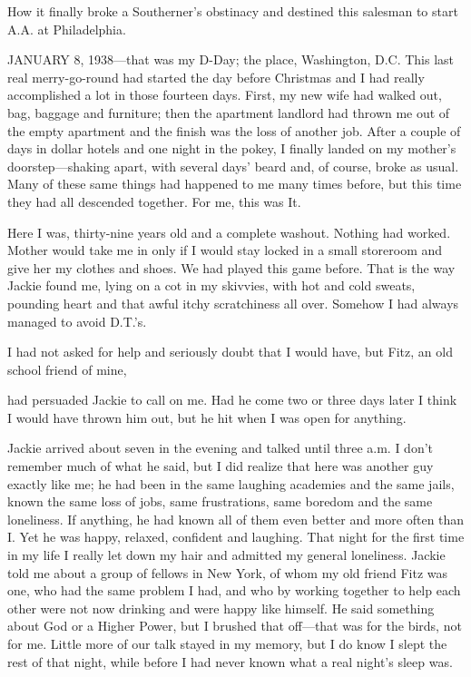 
\bbChapterPreamble


\begin{biblechapter}
    How it finally broke a Southerner’s obstinacy 
    and destined this salesman to start A.A. at Philadelphia.
\end{biblechapter}


\begin{biblechapter}
    JANUARY 8, 1938—that was my D-Day; 
    the place, Washington, D.C.
\verse This last real merry-go-round 
    had started the day before Christmas 
    and I had really accomplished a lot in those fourteen days.
\verse First, my new wife had walked out, 
    bag, baggage and furniture; 
    then the apartment landlord 
    had thrown me out of the empty apartment 
    and the finish was the loss of another job.
\verse After a couple of days in dollar hotels and one night in the pokey, 
    I finally landed on my mother’s doorstep—shaking apart, 
    with several days’ beard and, 
    of course, broke as usual.
\verse Many of these same things had happened to me many times before, 
    but this time they had all descended together.
\verse For me, this was It.

\verse Here I was, thirty-nine years old and a complete washout.
\verse Nothing had worked.
\verse Mother would take me in only if I would stay locked 
    in a small storeroom and give her my clothes and shoes.
\verse We had played this game before.
\verse That is the way Jackie found me, 
    lying on a cot in my skivvies, 
    with hot and cold sweats, 
    pounding heart and that awful itchy scratchiness all over.
\verse Somehow I had always managed to avoid D.T.’s.

I had not asked for help and seriously doubt that I would have, but Fitz, an old school friend of mine,

had persuaded Jackie to call on me. Had he come two or three days later I think I would have thrown him out, but he hit when I was open for anything.

Jackie arrived about seven in the evening and talked until three a.m. I don’t remember much of what he said, but I did realize that here was another guy exactly like me; he had been in the same laughing academies and the same jails, known the same loss of jobs, same frustrations, same boredom and the same loneliness. If anything, he had known all of them even better and more often than I. Yet he was happy, relaxed, confident and laughing. That night for the first time in my life I really let down my hair and admitted my general loneliness. Jackie told me about a group of fellows in New York, of whom my old friend Fitz was one, who had the same problem I had, and who by working together to help each other were not now drinking and were happy like himself. He said something about God or a Higher Power, but I brushed that off—that was for the birds, not for me. Little more of our talk stayed in my memory, but I do know I slept the rest of that night, while before I had never known what a real night’s sleep was.


\end{biblechapter}
